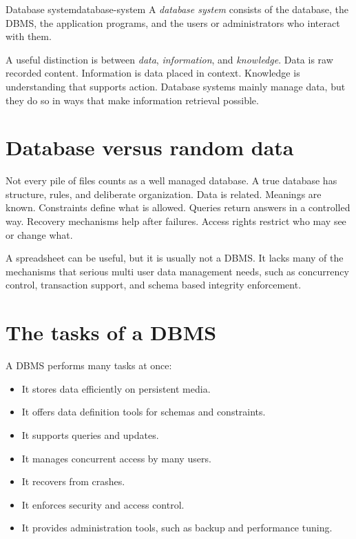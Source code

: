 \documentclass[11pt,a4paper,openany]{book}
\begin{document}
\begin{definition}{Database system}{database-system}
A \emph{database system} consists of the database, the DBMS, the application programs, and the users or administrators who interact with them.
\end{definition}

A useful distinction is between \emph{data}, \emph{information}, and \emph{knowledge}. Data is raw recorded content. Information is data placed in context. Knowledge is understanding that supports action. Database systems mainly manage data, but they do so in ways that make information retrieval possible.

\section{Database versus random data}
Not every pile of files counts as a well managed database. A true database has structure, rules, and deliberate organization. Data is related. Meanings are known. Constraints define what is allowed. Queries return answers in a controlled way. Recovery mechanisms help after failures. Access rights restrict who may see or change what.

A spreadsheet can be useful, but it is usually not a DBMS. It lacks many of the mechanisms that serious multi user data management needs, such as concurrency control, transaction support, and schema based integrity enforcement.

\section{The tasks of a DBMS}
A DBMS performs many tasks at once:

\begin{itemize}
\item It stores data efficiently on persistent media.
\item It offers data definition tools for schemas and constraints.
\item It supports queries and updates.
\item It manages concurrent access by many users.
\item It recovers from crashes.
\item It enforces security and access control.
\item It provides administration tools, such as backup and performance tuning.
\end{itemize}
\end{document}
